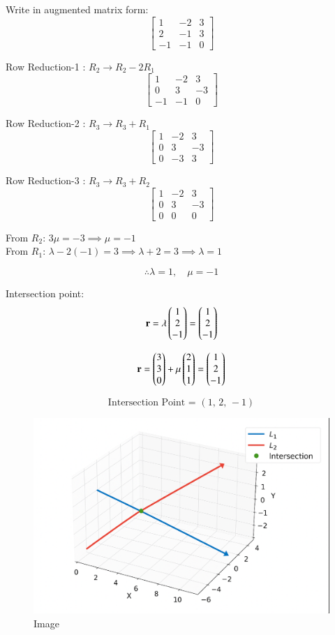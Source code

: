 \documentclass[journal]{IEEEtran}
\begin{document}
Write in augmented matrix form:
\[
\left[\begin{array}{rr|r}
1 & -2 & 3 \\[1mm]
2 & -1 & 3 \\[1mm]
-1 & -1 & 0
\end{array}\right]
\]

Row Reduction-1 : $R_2 \rightarrow R_2 - 2 R_1$
\[
\left[\begin{array}{rr|r}
1 & -2 & 3 \\[1mm]
0 & 3 & -3 \\[1mm]
-1 & -1 & 0
\end{array}\right]
\]

Row Reduction-2 : $R_3 \rightarrow R_3 + R_1$
\[
\left[\begin{array}{rr|r}
1 & -2 & 3 \\[1mm]
0 & 3 & -3 \\[1mm]
0 & -3 & 3
\end{array}\right]
\]

Row Reduction-3 : $R_3 \rightarrow R_3 + R_2$
\[
\left[\begin{array}{rr|r}
1 & -2 & 3 \\[1mm]
0 & 3 & -3 \\[1mm]
0 & 0 & 0
\end{array}\right]
\]

From $R_2$: $3 \mu = -3 \implies \mu = -1$ \\
From $R_1$: $\lambda - 2(-1) = 3 \implies \lambda + 2 = 3 \implies \lambda = 1$

\[
\therefore \lambda = 1, \quad \mu = -1
\]

Intersection point:
\[
\mathbf{r} = \lambda \begin{pmatrix}1\\2\\-1\end{pmatrix} = \begin{pmatrix}1\\2\\-1\end{pmatrix}
\]

\[
\mathbf{r} = \begin{pmatrix}3\\3\\0\end{pmatrix} + \mu \begin{pmatrix}2\\1\\1\end{pmatrix} = \begin{pmatrix}1\\2\\-1\end{pmatrix}
\]

\[
\boxed{\text{Intersection Point = } (1,\,2,\,-1)}
\]

\begin{figure}[H]
    \centering
    \includegraphics[width=0.75\linewidth]{figs/image.png}
    \caption{Image}
    \label{fig:placeholder}
\end{figure}
\end{document}

